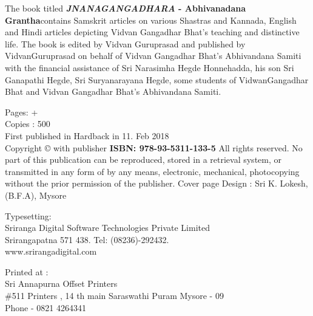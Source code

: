 \thispagestyle{empty}
{\fontsize{10}{12}\selectfont
The book titled \textbf{\emph {JNANAGANGADHARA }- Abhivanadana Grantha}\break contains Samskrit articles on various Shastras and Kannada, English and Hindi articles depicting Vidvan Gangadhar Bhat’s teaching and  distinctive life. The book is edited by Vidvan Guruprasad and published by Vidvan\break Guruprasad on behalf of Vidvan Gangadhar Bhat’s Abhivandana Samiti with the financial assistance of Sri Narasimha Hegde Honnehadda, his son Sri Ganapathi Hegde,  Sri Suryanarayana Hegde, some students of Vidwan\break  Gangadhar Bhat and Vidvan Gangadhar Bhat's Abhivandana Samiti.

\begin{flushleft}

\bigskip
Pages: \pageref{prelims_pages}+\pageref{bookend}\\
\smallskip
Copies : 500\\
\bigskip
First published in Hardback in 11. Feb \enginline{-} 2018 \\
\smallskip
Copyright ©  with publisher
\vfill
\bigskip
\textbf{ISBN: 978-93-5311-133-5}
\vfill
\bigskip
All rights reserved. No part of this publication can be reproduced, stored in a retrieval system, or transmitted in any form of by any means, electronic, mechanical, photocopying without the prior permission of the publisher.
\vfill
\bigskip
Cover page Design : Sri K. Lokesh, (B.F.A), Mysore

\bigskip
\noindent
Typesetting:\\ 
{\selectfont Sriranga Digital Software Technologies Private Limited}\\ 
Srirangapatna 571 438. Tel: (08236)-292432.\\
www.srirangadigital.com
\vfill

\bigskip
Printed at :\\
Sri Annapurna Offset Printers\\
\#511 Printers , 14 th main Saraswathi Puram Mysore - 09\\
Phone - 0821 4264341

\end{flushleft}

}
